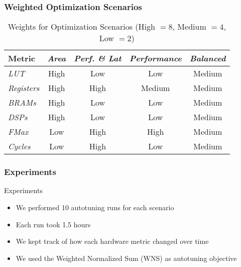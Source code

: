 \documentclass[10pt, compress, xcolor={table,xcdraw,usenames}, aspectratio=169]{beamer}
\begin{document}
\begin{frame}
    \frametitle{Weighted Optimization Scenarios}
        \begin{table}[htpb]
            \caption{\alert{Weights} for \alert{Optimization Scenarios} (\alert{High} $= 8$, \alert{Medium} $= 4$, \alert{Low} $= 2$)}
            \centering
            \begin{tabular}{@{}lcccc@{}}
                \toprule
                Metric & \textit{Area} & \textit{Perf. \& Lat} & \textit{Performance} & \textit{Balanced} \\ \midrule
                \textit{LUT} & \cellcolor[HTML]{9B94B6} High & \cellcolor[HTML]{DD9583} Low & \cellcolor[HTML]{DD9583} Low & \cellcolor[HTML]{E3DBB3} Medium \\
                \textit{Registers} & \cellcolor[HTML]{9B94B6} High & \cellcolor[HTML]{9B94B6} High & \cellcolor[HTML]{E3DBB3} Medium & \cellcolor[HTML]{E3DBB3} Medium \\
                \textit{BRAMs} & \cellcolor[HTML]{9B94B6} High & \cellcolor[HTML]{DD9583} Low & \cellcolor[HTML]{DD9583} Low & \cellcolor[HTML]{E3DBB3} Medium \\
                \textit{DSPs} & \cellcolor[HTML]{9B94B6} High & \cellcolor[HTML]{DD9583} Low & \cellcolor[HTML]{DD9583} Low & \cellcolor[HTML]{E3DBB3} Medium \\
                \textit{FMax} & \cellcolor[HTML]{DD9583} Low & \cellcolor[HTML]{9B94B6} High & \cellcolor[HTML]{9B94B6} High & \cellcolor[HTML]{E3DBB3} Medium \\
                \textit{Cycles} & \cellcolor[HTML]{DD9583} Low & \cellcolor[HTML]{9B94B6} High & \cellcolor[HTML]{DD9583} Low & \cellcolor[HTML]{E3DBB3} Medium \\ \bottomrule
            \end{tabular}
        \end{table}
\end{frame}

\begin{frame}
    \frametitle{Experiments}
    \begin{block}{Experiments}
        \begin{itemize}
            \item We performed 10 \alert{autotuning runs for each scenario}
            \item Each run took \alert{1.5 hours}
            \item We kept track of \alert{how each hardware metric changed over
                time}
            \item We used the \alert{Weighted Normalized Sum} (\alert{WNS}) as
                \alert{autotuning objective}
        \end{itemize}
    \end{block}
\end{frame}
\end{document}
